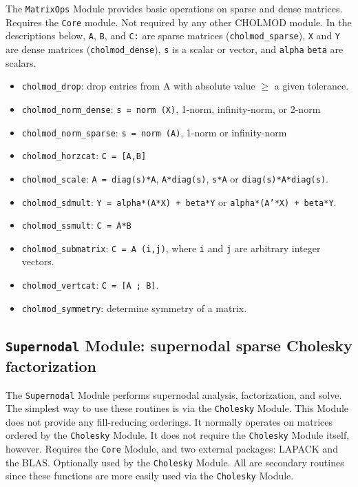 \documentclass[11pt]{article}
\begin{document}
The {\tt MatrixOps} Module provides
basic operations on sparse and dense matrices.
Requires the {\tt Core} module.  Not required by any other CHOLMOD module.
In the descriptions below,
{\tt A}, {\tt B}, and {\tt C:} are sparse matrices ({\tt cholmod\_sparse}),
{\tt X} and {\tt Y} are dense matrices ({\tt cholmod\_dense}),
{\tt s} is a scalar or vector, and
{\tt alpha} {\tt beta} are scalars.

    \begin{itemize}
    \item {\tt cholmod\_drop}: drop entries from A with absolute value $\ge$ a given tolerance.
    \item {\tt cholmod\_norm\_dense}: {\tt s = norm (X)}, 1-norm, infinity-norm, or 2-norm
    \item {\tt cholmod\_norm\_sparse}: {\tt s = norm (A)}, 1-norm or infinity-norm
    \item {\tt cholmod\_horzcat}: {\tt C = [A,B]}
    \item {\tt cholmod\_scale}: {\tt A = diag(s)*A}, {\tt A*diag(s)}, {\tt s*A} or {\tt diag(s)*A*diag(s)}.
    \item {\tt cholmod\_sdmult}: {\tt Y = alpha*(A*X) + beta*Y} or {\tt alpha*(A'*X) + beta*Y}.
    \item {\tt cholmod\_ssmult}: {\tt C = A*B}
    \item {\tt cholmod\_submatrix}: {\tt C = A (i,j)}, where {\tt i} and {\tt j} are arbitrary integer vectors.
    \item {\tt cholmod\_vertcat}: {\tt C = [A ; B]}.
    \item {\tt cholmod\_symmetry}: determine symmetry of a matrix.
    \end{itemize}

\newpage \subsection{{\tt Supernodal} Module: supernodal sparse Cholesky factorization}

The {\tt Supernodal} Module performs
supernodal analysis, factorization, and solve.  The simplest way to use
these routines is via the {\tt Cholesky} Module.  This Module does not provide any
fill-reducing orderings.  It normally operates on matrices ordered by the
{\tt Cholesky} Module.
It does not require the {\tt Cholesky} Module itself, however.
Requires the {\tt Core} Module, and two external packages: LAPACK and the BLAS.
Optionally used by the {\tt Cholesky} Module.  All are secondary routines
since these functions are more easily used via the {\tt Cholesky} Module.
\end{document}

